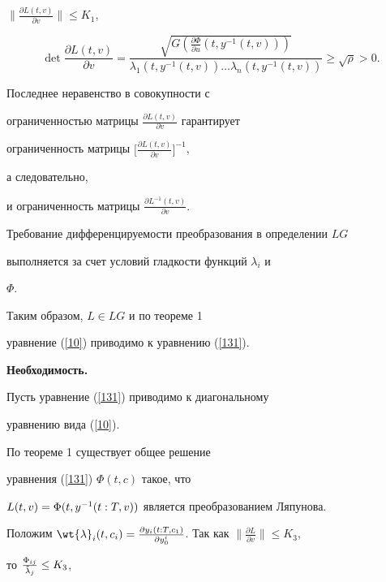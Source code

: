 \begin{pf}
$\big \|\frac{\partial L(t,v)}{\partial v}\big \|\leq K_{1}$,


$$


\det\frac{\partial L(t,v)}{\partial v}=


\frac{\sqrt{G(\frac{\partial \Phi}{\partial u}(t,y^{-1}(t,v)))}}


{\lambda_{1}(t,y^{-1}(t,v))\dotsc


\lambda_{n}(t,y^{-1}(t,v))}\geq\sqrt{\rho}>0.


$$


Последнее неравенство в совокупности с


ограниченностью матрицы $\frac{\partial L(t,v)}{\partial v}$ гарантирует


ограниченность матрицы $\big[\frac{\partial L(t,v)}{\partial v}\big]^{-1}$,


а следовательно,


и ограниченность матрицы $\frac{\partial L^{-1}(t,v)}{\partial v}$.


Требование дифференцируемости преобразования в определении $LG$ 


выполняется за счет условий гладкости функций $\lambda_{i}$ и


$\Phi$.





Таким образом, $L\in LG$ и по теореме 1 


уравнение (\ref{10}) приводимо к уравнению (\ref{131}).


\smallskip





{\bf Необходимость.}


Пусть уравнение (\ref{131}) приводимо к диагональному 


уравнению вида (\ref{10}).


По теореме 1 существует общее решение


уравнения (\ref{131}) $\Phi(t,c)$ такое, что


$L(t,v)=\linebreak \Phi(t,y^{-1}(t:T,v))$ является преобразованием Ляпунова.





Положим $\wt{\lambda}_{i}(t,c_{i})=\frac{\partial y_{i}(t:T,c_{1})}{\partial


y_{0}^{i}}$. Так как $\big\|\frac{\partial L}{\partial v}\big\|\leq K_{3}$,


то $\frac{\Phi_{ij}}{\Tilde{\lambda}_{j}}\leq K_{3}$,



\end{pf}
